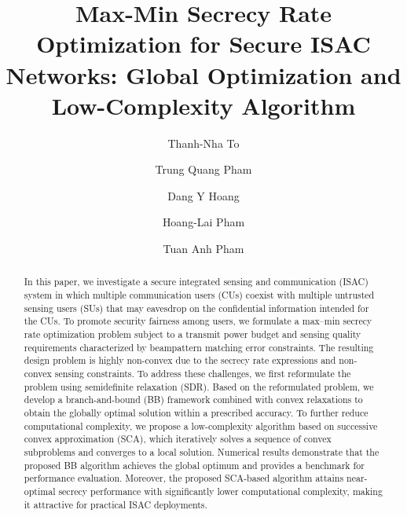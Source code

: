 \documentclass[runningheads]{llncs}
\begin{document}
% 
\title{Max-Min Secrecy Rate Optimization for Secure ISAC Networks: Global Optimization and Low-Complexity Algorithm}
%
%

\author{
Thanh-Nha To \and
Trung Quang Pham \and
Dang Y Hoang \and
Hoang-Lai Pham \and
Tuan Anh Pham
}
%
%
%
\maketitle              %
%
\begin{abstract}
In this paper, we investigate a secure integrated sensing and communication (ISAC) system in which multiple communication users (CUs) coexist with multiple untrusted sensing users (SUs) that may eavesdrop on the confidential information intended for the CUs. To promote security fairness among users, we formulate a max–min secrecy rate optimization problem subject to a transmit power budget and sensing quality requirements characterized by beampattern matching error constraints. The resulting design problem is highly non-convex due to the secrecy rate expressions and non-convex sensing constraints. To address these challenges, we first reformulate the problem using semidefinite relaxation (SDR). Based on the reformulated problem, we develop a branch-and-bound (BB) framework combined with convex relaxations to obtain the globally optimal solution within a prescribed accuracy. To further reduce computational complexity, we propose a low-complexity algorithm based on successive convex approximation (SCA), which iteratively solves a sequence of convex subproblems and converges to a local solution. Numerical results demonstrate that the proposed BB algorithm achieves the global optimum and provides a benchmark for performance evaluation. Moreover, the proposed SCA-based algorithm attains near-optimal secrecy performance with significantly lower computational complexity, making it attractive for practical ISAC deployments. 

\end{abstract}
\end{document}
